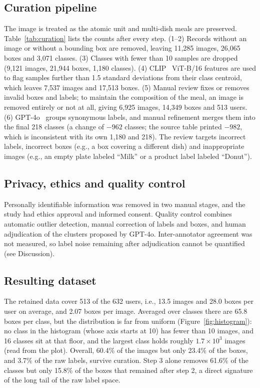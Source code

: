 \documentclass[sigconf, nonacm]{acmart}
\begin{document}
\subsection{Curation pipeline}
The image is treated as the atomic unit and multi-dish meals are preserved. Table~\ref{tab:curation} lists the counts after every step. (1--2) Records without an image or without a bounding box are removed, leaving 11,285 images, 26,065 boxes and 3,071 classes. (3) Classes with fewer than 10 samples are dropped (9,121 images, 21,944 boxes, 1,180 classes). (4) CLIP~\cite{CLIP} ViT-B/16 features are used to flag samples further than 1.5 standard deviations from their class centroid, which leaves 7,537 images and 17,513 boxes. (5) Manual review fixes or removes invalid boxes and labels; to maintain the composition of the meal, an image is removed entirely or not at all, giving 6,925 images, 14,349 boxes and 513 users. (6) GPT-4o~\cite{achiam2023gpt} groups synonymous labels, and manual refinement merges them into the final 218 classes (a change of $-962$ classes; the source table printed $-982$, which is inconsistent with its own 1,180 and 218). The review targets incorrect labels, incorrect boxes (e.g., a box covering a different dish) and inappropriate images (e.g., an empty plate labeled ``Milk'' or a product label labeled ``Donut'').



\subsection{Privacy, ethics and quality control}
Personally identifiable information was removed in two manual stages, and the study had ethics approval and informed consent. Quality control combines automatic outlier detection, manual correction of labels and boxes, and human adjudication of the clusters proposed by GPT-4o. Inter-annotator agreement was not measured, so label noise remaining after adjudication cannot be quantified (see Discussion).

\subsection{Resulting dataset}
The retained data cover 513 of the 632 users, i.e., 13.5 images and 28.0 boxes per user on average, and 2.07 boxes per image. Averaged over classes there are 65.8 boxes per class, but the distribution is far from uniform (Figure~\ref{fig:histogram}): no class in the histogram (whose axis starts at 10) has fewer than 10 images, and 16 classes sit at that floor, and the largest class holds roughly $1.7\times10^{3}$ images (read from the plot). Overall, 60.4\% of the images but only 23.4\% of the boxes, and 3.7\% of the raw labels, survive curation. Step 3 alone removes 61.6\% of the classes but only 15.8\% of the boxes that remained after step 2, a direct signature of the long tail of the raw label space.
\end{document}
